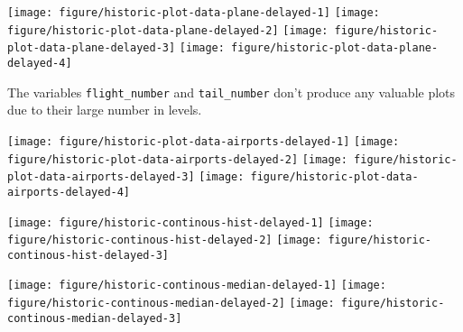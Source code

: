 \documentclass{article}\usepackage[]{graphicx}\usepackage[]{color}
\newenvironment{knitrout}{}{} %
\begin{document}
\begin{knitrout}
\color{fgcolor}

{\centering \texttt{[image: figure/historic-plot-data-plane-delayed-1]} 
\texttt{[image: figure/historic-plot-data-plane-delayed-2]} 
\texttt{[image: figure/historic-plot-data-plane-delayed-3]} 
\texttt{[image: figure/historic-plot-data-plane-delayed-4]} 

}



\end{knitrout}

The variables \verb+flight_number+ and \verb+tail_number+ don't produce any valuable plots due to their large number in levels.


\begin{landscape}
\begin{knitrout}
\color{fgcolor}

{\centering \texttt{[image: figure/historic-plot-data-airports-delayed-1]} 
\texttt{[image: figure/historic-plot-data-airports-delayed-2]} 
\texttt{[image: figure/historic-plot-data-airports-delayed-3]} 
\texttt{[image: figure/historic-plot-data-airports-delayed-4]} 

}



\end{knitrout}
\vspace{3 mm}



\begin{knitrout}
\color{fgcolor}

{\centering \texttt{[image: figure/historic-continous-hist-delayed-1]} 
\texttt{[image: figure/historic-continous-hist-delayed-2]} 
\texttt{[image: figure/historic-continous-hist-delayed-3]} 

}



\end{knitrout}
\vspace{2 mm}

\begin{knitrout}
\color{fgcolor}

{\centering \texttt{[image: figure/historic-continous-median-delayed-1]} 
\texttt{[image: figure/historic-continous-median-delayed-2]} 
\texttt{[image: figure/historic-continous-median-delayed-3]} 

}



\end{knitrout}
\end{landscape}
\end{document}
